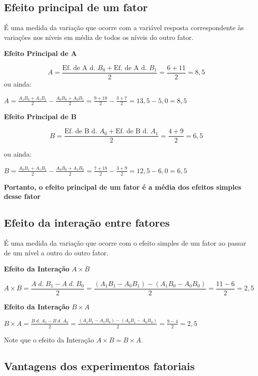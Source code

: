 \documentclass[
]{article}
\begin{document}
\subsection{Efeito principal de um
fator}\label{efeito-principal-de-um-fator}

É uma medida da variação que ocorre com a variável resposta
correspondente às variações nos níveis em média de todos os níveis do
outro fator.

\textbf{Efeito Principal de A}

\[
A = \frac{\text{Ef. de A d. }B_0+\text{Ef. de A d. }B_1}{2}=\frac{6+11}{2}=8,5
\] ou ainda:

\(A = \frac{A_1B_0+A_1B_1}{2}-\frac{A_0B_0+A_0B_1}{2} = \frac{9+18}{2}-\frac{3+7}{2} = 13,5-5,0=8,5\)

\textbf{Efeito Principal de B}

\[
B = \frac{\text{Ef. de B d. }A_0+\text{Ef. de B d. }A_1}{2}=\frac{4+9}{2}=6,5
\]

ou ainda:

\(B = \frac{A_0B_1+A_1B_1 }{2}-\frac{A_0B_0+A _1B_0}{2}  = \frac{7+18}{2}-\frac{3+9}{2} = 12,5-6,0=6,5\)

\textbf{Portanto, o efeito principal de um fator é a média dos efeitos
simples desse fator}

\subsection{Efeito da interação entre
fatores}\label{efeito-da-interauxe7uxe3o-entre-fatores}

É uma medida da variação que ocorre com o efeito simples de um fator ao
passar de um nível a outro do outro fator.

\textbf{Efeito da Interação} \(A \times B\)

\[
A \times B = \frac{A\;d.\;B_1-A\;d.\;B_0}{2} = \frac{(A_1B_1-A_0B_1)-(A_1B_0-A_0B_0)}{2}=\frac{11-6}{2}=2,5
\]

\textbf{Efeito da Interação} \(B \times A\)

\(B \times A = \frac{B\;d.\;A_1-B\;d.\;A_0}{2} = \frac{(A_1B_1-A_1B_0)-(A_0B_1-A_0B_0)}{2}=\frac{9-4}{2} =  2,5\)

Note que o efeito da Interação \(A \times B = B \times A\).

\subsection{Vantagens dos experimentos
fatoriais}\label{vantagens-dos-experimentos-fatoriais}
\end{document}
